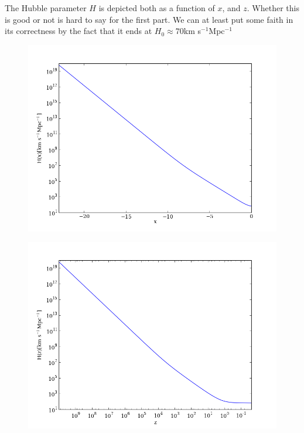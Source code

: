 \documentclass{aa}   %
\begin{document}
 The Hubble parameter $H$ is depicted both as a function of $x$, and $z$. Whether this is good or not is hard to say for the first part. We can at least put some faith in its correctness by the fact that it ends at $H_0 \approx 70$km s$^{-1}$Mpc$^{-1}$
 
  \begin{figure}
  \includegraphics[width=.49\textwidth]{figure_2.png}
  \caption{}
 \label{figure2}
 \end{figure}

 
 \begin{figure}
  \includegraphics[width=.49\textwidth]{figure_3.png}
  \caption{}
 \label{figure3}
 \end{figure}
% 

\end{document}
